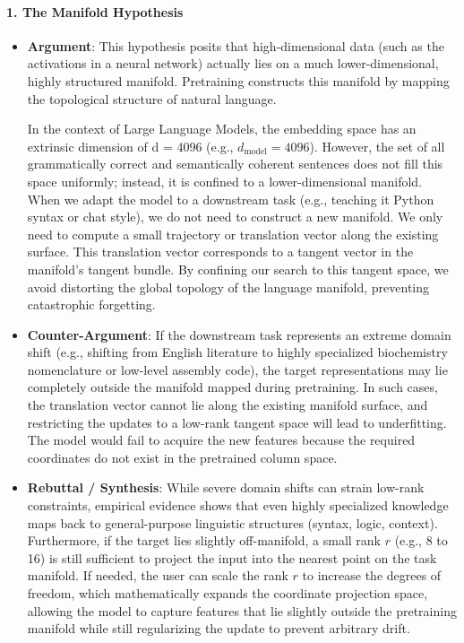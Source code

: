 \paragraph{1. The Manifold Hypothesis}
\begin{itemize}
  \item \textbf{Argument}: This hypothesis posits that high-dimensional data (such as the activations in a neural network) actually lies on a much lower-dimensional, highly structured manifold. Pretraining constructs this manifold by mapping the topological structure of natural language.
  
  In the context of Large Language Models, the embedding space has an extrinsic dimension of d = 4096 (e.g., $d_{\text{model}} = 4096$). However, the set of all grammatically correct and semantically coherent sentences does not fill this space uniformly; instead, it is confined to a lower-dimensional manifold. When we adapt the model to a downstream task (e.g., teaching it Python syntax or chat style), we do not need to construct a new manifold. We only need to compute a small trajectory or translation vector along the existing surface. This translation vector corresponds to a tangent vector in the manifold's tangent bundle. By confining our search to this tangent space, we avoid distorting the global topology of the language manifold, preventing catastrophic forgetting.
  
  \item \textbf{Counter-Argument}: If the downstream task represents an extreme domain shift (e.g., shifting from English literature to highly specialized biochemistry nomenclature or low-level assembly code), the target representations may lie completely outside the manifold mapped during pretraining. In such cases, the translation vector cannot lie along the existing manifold surface, and restricting the updates to a low-rank tangent space will lead to underfitting. The model would fail to acquire the new features because the required coordinates do not exist in the pretrained column space.
  
  \item \textbf{Rebuttal / Synthesis}: While severe domain shifts can strain low-rank constraints, empirical evidence shows that even highly specialized knowledge maps back to general-purpose linguistic structures (syntax, logic, context). Furthermore, if the target lies slightly off-manifold, a small rank $r$ (e.g., 8 to 16) is still sufficient to project the input into the nearest point on the task manifold. If needed, the user can scale the rank $r$ to increase the degrees of freedom, which mathematically expands the coordinate projection space, allowing the model to capture features that lie slightly outside the pretraining manifold while still regularizing the update to prevent arbitrary drift.
\end{itemize}

